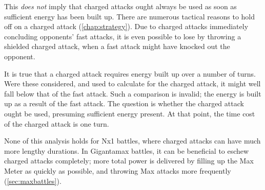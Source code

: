 This \textit{does not} imply that charged attacks ought always be used as soon as
  sufficient energy has been built up.
There are numerous tactical reasons to hold off on a charged attack (\autoref{chap:strategy}).
Due to charged attacks immediately concluding opponents' fast attacks,
 it is even possible to lose by throwing a shielded charged attack, when
 a fast attack might have knocked out the opponent.

It is true that a charged attack requires energy built up over a number of turns.
Were these considered, and used to calculate \PPT{} for the charged attack,
  it might well fall below that of the fast attack.
Such a comparison is invalid; the energy is built up as a result of the fast attack.
The question is whether the charged attack ought be used, presuming sufficient energy present.
At that point, the time cost of the charged attack is one turn.

None of this analysis holds for Nx1 battles, where charged attacks can have much more lengthy durations.
In Gigantamax battles, it can be beneficial to eschew charged attacks completely;
 more total power is delivered by filling up the Max Meter as quickly as possible,
 and throwing Max attacks more frequently (\autoref{sec:maxbattles}).

